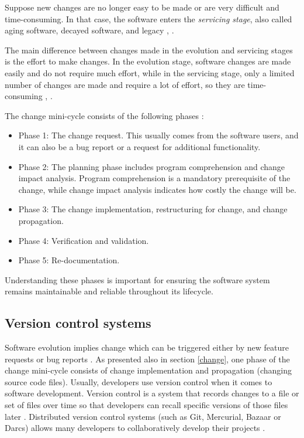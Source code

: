 Suppose new changes are no longer easy to be made or are very difficult and time-consuming. In that case, the software enters the \textit{servicing stage}, also called aging software, decayed software, and legacy \cite{Software-life-cycle}, \cite{363157}.

The main difference between changes made in the evolution and servicing stages is the effort to make changes. In the evolution stage, software changes are made easily and do not require much effort, while in the servicing stage, only a limited number of changes are made and require a lot of effort, so they are time-consuming \cite{Bennett}, \cite{Rajlich}.

The change mini-cycle consists of the following phases \cite{810308}:
\begin{itemize}
\item Phase 1: The change request. This usually comes from the software users, and it can also be a bug report or a request for additional functionality.
\item Phase 2: The planning phase includes program comprehension and change impact analysis. Program comprehension is a mandatory prerequisite of the change, while change
impact analysis indicates how costly the change will be. \cite{Bohner}
\item Phase 3: The change implementation, restructuring for change, and change propagation.
\item Phase 4: Verification and validation.
\item Phase 5: Re-documentation.
\end{itemize}

Understanding these phases is important for ensuring the software system remains maintainable and reliable throughout its lifecycle.


\subsection{Version control systems}

Software evolution implies change which can be triggered either by new feature requests or bug reports \cite{articleEvolution}. As presented also in section \ref{change}, one phase of the change mini-cycle consists of change implementation and propagation (changing source code files). 
Usually, developers use version control when it comes to software development. Version control is a system that records changes to a file or set of files over time so that developers can recall specific versions of those files later \cite{svn}.
Distributed version control systems (such as Git, Mercurial, Bazaar or Darcs) allows many developers to collaboratively develop their projects \cite{7471284}.

